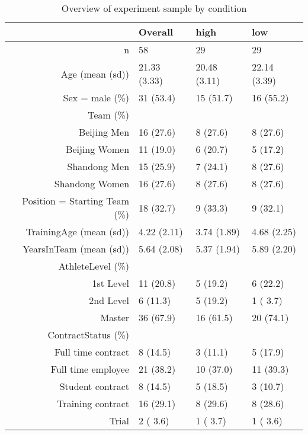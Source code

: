 \begin{table}[ht]
\centering
\begin{tabular}{rlll}
  \hline
 & Overall & high & low \\ 
  \hline
n &    58 &    29 &    29 \\ 
  Age (mean (sd)) & 21.33 (3.33) & 20.48 (3.11) & 22.14 (3.39) \\ 
  Sex = male (\%) &    31 (53.4)  &    15 (51.7)  &    16 (55.2)  \\ 
  Team (\%) &     &     &     \\ 
     Beijing Men &    16 (27.6)  &     8 (27.6)  &     8 (27.6)  \\ 
     Beijing Women &    11 (19.0)  &     6 (20.7)  &     5 (17.2)  \\ 
     Shandong Men &    15 (25.9)  &     7 (24.1)  &     8 (27.6)  \\ 
     Shandong Women &    16 (27.6)  &     8 (27.6)  &     8 (27.6)  \\ 
  Position = Starting Team (\%) &    18 (32.7)  &     9 (33.3)  &     9 (32.1)  \\ 
  TrainingAge (mean (sd)) &  4.22 (2.11) &  3.74 (1.89) &  4.68 (2.25) \\ 
  YearsInTeam (mean (sd)) &  5.64 (2.08) &  5.37 (1.94) &  5.89 (2.20) \\ 
  AthleteLevel (\%) &     &     &     \\ 
     1st Level &    11 (20.8)  &     5 (19.2)  &     6 (22.2)  \\ 
     2nd Level &     6 (11.3)  &     5 (19.2)  &     1 ( 3.7)  \\ 
     Master &    36 (67.9)  &    16 (61.5)  &    20 (74.1)  \\ 
  ContractStatus (\%) &     &     &     \\ 
     Full time contract &     8 (14.5)  &     3 (11.1)  &     5 (17.9)  \\ 
     Full time employee &    21 (38.2)  &    10 (37.0)  &    11 (39.3)  \\ 
     Student contract &     8 (14.5)  &     5 (18.5)  &     3 (10.7)  \\ 
     Training contract &    16 (29.1)  &     8 (29.6)  &     8 (28.6)  \\ 
     Trial &     2 ( 3.6)  &     1 ( 3.7)  &     1 ( 3.6)  \\ 
   \hline
\end{tabular}
\caption{Overview of experiment sample by condition} 
\label{tab:athleteDescriptivesTrainingOverall}
\end{table}
